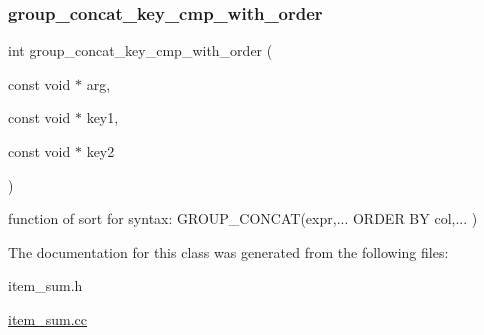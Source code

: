 \subsubsection{\texorpdfstring{group\+\_\+concat\+\_\+key\+\_\+cmp\+\_\+with\+\_\+order}{group\_concat\_key\_cmp\_with\_order}}
{\footnotesize\ttfamily int group\+\_\+concat\+\_\+key\+\_\+cmp\+\_\+with\+\_\+order (\begin{DoxyParamCaption}\item[{const void $\ast$}]{arg,  }\item[{const void $\ast$}]{key1,  }\item[{const void $\ast$}]{key2 }\end{DoxyParamCaption})\hspace{0.3cm}{\ttfamily [friend]}}

function of sort for syntax\+: G\+R\+O\+U\+P\+\_\+\+C\+O\+N\+C\+A\+T(expr,... O\+R\+D\+E\+R B\+Y col,... ) 

The documentation for this class was generated from the following files\+:\begin{DoxyCompactItemize}
\item 
item\+\_\+sum.\+h\item 
\mbox{\hyperlink{item__sum_8cc}{item\+\_\+sum.\+cc}}\end{DoxyCompactItemize}

